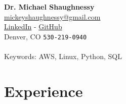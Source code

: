 \documentclass[11pt, a4paper]{article}
\begin{document}
{\LARGE \textbf{Dr. Michael Shaughnessy}}  \\[0.25cm]

{\color{hyperlinkcolor}\href{mailto:mickeyshaughnessy@gmail.com}{mickeyshaughnessy@gmail.com} \\ 
\href{https://www.linkedin.com/in/michaelshaughnessy1}{LinkedIn} - 
\href{https://github.com/mickeyshaughnessy}{GitHub} 
}
\\
Denver, CO
\texttt{530-219-0940}\\




 \\
Keywords: AWS, Linux, Python, SQL%


\section*{\color{mycolor4}\textbf{Experience}}
\noindent
\end{document}
